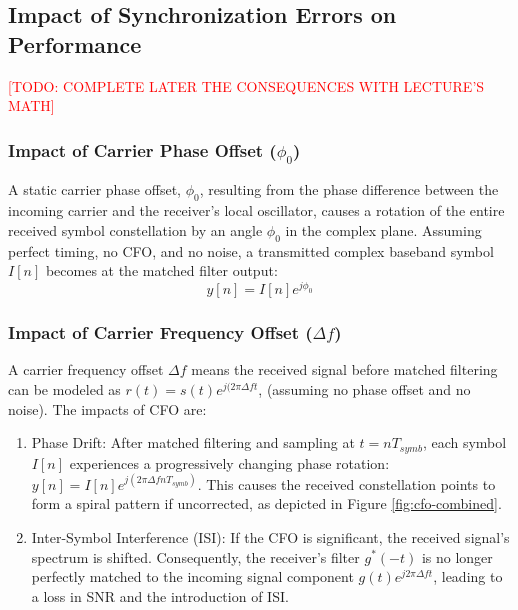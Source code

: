 \newpage
\subsection{Impact of Synchronization Errors on Performance}
\textcolor{red}{[TODO: COMPLETE LATER THE CONSEQUENCES WITH LECTURE'S MATH]}\par

\subsubsection{Impact of Carrier Phase Offset ($\phi_0$)}
A static carrier phase offset, $\phi_0$, resulting from the phase difference between the incoming carrier and the receiver's local oscillator, causes a rotation of the entire received symbol constellation by an angle $\phi_0$ in the complex plane. Assuming perfect timing, no CFO, and no noise, a transmitted complex baseband symbol $I[n]$ becomes at the matched filter output:
\begin{equation}
	y[n] = I[n]e^{j\phi_0}
\end{equation}

\subsubsection{Impact of Carrier Frequency Offset ($\Delta f$)}
A carrier frequency offset $\Delta f$ means the received signal before matched filtering can be modeled as $r(t) = s(t) e^{j(2\pi \Delta f t}$, (assuming no phase offset and no noise). The impacts of CFO are:
\begin{enumerate}
	\item Phase Drift: After matched filtering and sampling at $t = nT_{symb}$, each symbol $I[n]$ experiences a progressively changing phase rotation: $y[n] = I[n] e^{j(2\pi \Delta f nT_{symb})}$. This causes the received constellation points to form a spiral pattern if uncorrected, as depicted in Figure \ref{fig:cfo-combined}.
	\item Inter-Symbol Interference (ISI): If the CFO is significant, the received signal's spectrum is shifted. Consequently, the receiver's filter $g^*(-t)$ is no longer perfectly matched to the incoming signal component $g(t)e^{j2\pi \Delta f t}$, leading to a loss in SNR and the introduction of ISI.
\end{enumerate}


